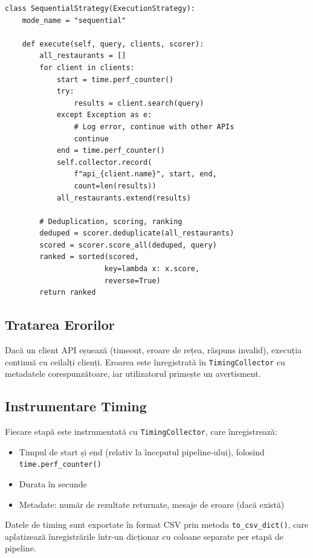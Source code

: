 \documentclass[12pt,a4paper]{article}
\begin{document}
\begin{lstlisting}[caption={Implementarea SequentialStrategy}]
class SequentialStrategy(ExecutionStrategy):
    mode_name = "sequential"

    def execute(self, query, clients, scorer):
        all_restaurants = []
        for client in clients:
            start = time.perf_counter()
            try:
                results = client.search(query)
            except Exception as e:
                # Log error, continue with other APIs
                continue
            end = time.perf_counter()
            self.collector.record(
                f"api_{client.name}", start, end,
                count=len(results))
            all_restaurants.extend(results)

        # Deduplication, scoring, ranking
        deduped = scorer.deduplicate(all_restaurants)
        scored = scorer.score_all(deduped, query)
        ranked = sorted(scored,
                       key=lambda x: x.score,
                       reverse=True)
        return ranked
\end{lstlisting}

\subsection{Tratarea Erorilor}

Dacă un client API eșuează (timeout, eroare de rețea, răspuns invalid), execuția continuă cu ceilalți clienți. Eroarea este înregistrată în \texttt{TimingCollector} cu metadatele corespunzătoare, iar utilizatorul primește un avertisment.

\subsection{Instrumentare Timing}

Fiecare etapă este instrumentată cu \texttt{TimingCollector}, care înregistrează:
\begin{itemize}
    \item Timpul de start și end (relativ la începutul pipeline-ului), folosind \texttt{time.perf\_counter()}
    \item Durata în secunde
    \item Metadate: număr de rezultate returnate, mesaje de eroare (dacă există)
\end{itemize}

Datele de timing sunt exportate în format CSV prin metoda \texttt{to\_csv\_dict()}, care aplatizează înregistrările într-un dicționar cu coloane separate per etapă de pipeline.
\end{document}
